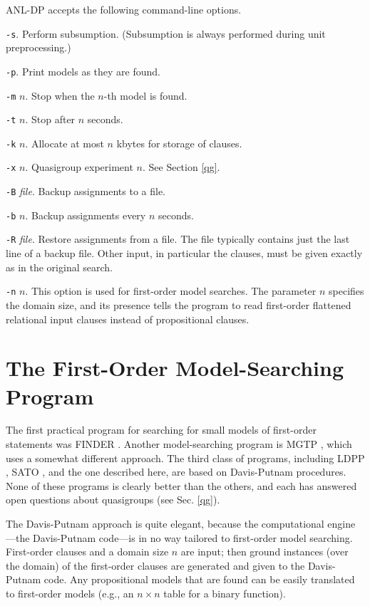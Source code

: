 ANL-DP accepts the following command-line options.
\begin{description}
\item {\verb:-s:.}
Perform subsumption.  (Subsumption is always performed during unit preprocessing.)
\item {\verb:-p:.}
Print models as they are found.
\item {\verb:-m: $n$.}
Stop when the $n$-th model is found.
\item {\verb:-t: $n$.}
Stop after $n$ seconds.
\item {\verb:-k: $n$.}
Allocate at most $n$ kbytes for storage of clauses.
\item {\verb:-x: $n$.}
Quasigroup experiment $n$.  See Section \ref{qg}.
\item {\verb:-B: {\it file}.}
Backup assignments to a file.
\item {\verb:-b: $n$.}
Backup assignments every $n$ seconds.
\item {\verb:-R: {\it file}.}
Restore assignments from a file.  The file typically contains just the
last line of a backup file.  Other input, in particular the clauses,
must be given exactly as in the original search.
\item {\verb:-n: $n$.}
This option is used for first-order model searches.  The parameter $n$
specifies the domain size, and its presence tells the program to
read first-order flattened relational input clauses instead of propositional
clauses.
\end{description}

\section{The First-Order Model-Searching Program}

The first practical program for searching for small models of
first-order statements was FINDER \cite{finder3}.  Another
model-searching program is MGTP \cite{qg-slaney-fujita-stickel}, which
uses a somewhat different approach.  The third class of programs,
including LDPP
\cite{dp-trie}, SATO \cite{dp-trie}, and the one described here, are based
on Davis-Putnam procedures.  None of these programs is clearly better
than the others, and each has answered open questions about
quasigroups (see Sec. \ref{qg}).

The Davis-Putnam approach is quite elegant, because the computational
engine---the Davis-Putnam code---is in no way tailored to
first-order model searching.  First-order clauses and a domain
size $n$ are input; then ground instances (over the domain) of the first-order
clauses are generated and given to the Davis-Putnam code.  Any
propositional models that are found can be easily translated to
first-order models (e.g., an $n\times n$ table for a binary function).

